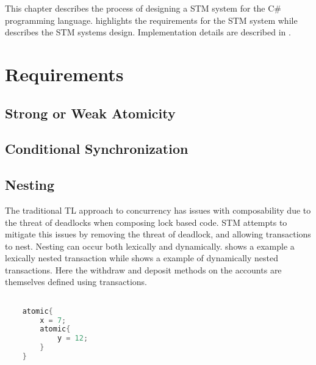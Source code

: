 \makeatletter {}\makeatother
{}
This chapter describes the process of designing a \ac{STM} system for the C\# programming language.  highlights the requirements for the \ac{STM} system while  describes the \ac{STM} systems design. Implementation details are described in .
\label{chap:stm_design}
\section{Requirements}
\label{sec:stm_requirements}

\subsection{Strong or Weak Atomicity}
\subsection{Conditional Synchronization}
\subsection{Nesting}
The traditional \ac{TL} approach to concurrency has issues with composability due to the threat of deadlocks\cite[p. 58]{sutter2005software} when composing lock based code. \ac{STM} attempts to mitigate this issues by removing the threat of deadlock, and allowing transactions to nest. Nesting can occur both lexically and dynamically\cite[p. 1]{kumar2011hparstm}\cite[p. 42]{harris2010transactional}\cite[p. 2081]{herlihy2011tm}.  shows a example a lexically nested transaction while  shows a example of dynamically nested transactions. Here the withdraw and deposit methods on the accounts are themselves defined using transactions.

\begin{lstlisting}[label=lst:stm_nested_transactions,
  caption={Lexically nested transactions},
  language=Java,  
  showspaces=false,
  showtabs=false,
  breaklines=true,
  showstringspaces=false,
  breakatwhitespace=true,
  commentstyle=\color{greencomments},
  keywordstyle=\color{bluekeywords},
  stringstyle=\color{redstrings},
  morekeywords={atomic, retry, orElse, var}]  % Start your code-block

	atomic{
		x = 7;
		atomic{
			y = 12;		
		}
	}
       
\end{lstlisting}


